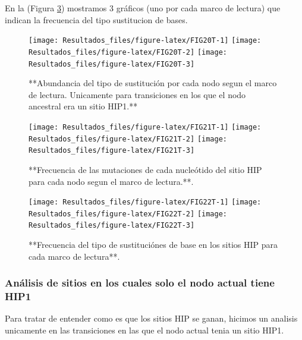 \documentclass[
]{book}
\begin{document}
En la (Figura \ref{fig:FIG22T}) mostramos 3 gráficos (uno por cada marco de lectura) que indican la frecuencia del tipo sustitucion de bases.

\begin{figure}

{\centering \texttt{[image: Resultados\_files/figure-latex/FIG20T-1]} \texttt{[image: Resultados\_files/figure-latex/FIG20T-2]} \texttt{[image: Resultados\_files/figure-latex/FIG20T-3]} 

}

\caption{**Abundancia del tipo de sustitución por cada nodo segun el marco de lectura. Unicamente para transiciones en los que el nodo ancestral era un sitio HIP1.**}\label{fig:FIG20T}
\end{figure}

\begin{figure}

{\centering \texttt{[image: Resultados\_files/figure-latex/FIG21T-1]} \texttt{[image: Resultados\_files/figure-latex/FIG21T-2]} \texttt{[image: Resultados\_files/figure-latex/FIG21T-3]} 

}

\caption{**Frecuencia de las mutaciones de cada nucleótido del sitio HIP para cada nodo segun el marco de lectura.**.}\label{fig:FIG21T}
\end{figure}

\begin{figure}

{\centering \texttt{[image: Resultados\_files/figure-latex/FIG22T-1]} \texttt{[image: Resultados\_files/figure-latex/FIG22T-2]} \texttt{[image: Resultados\_files/figure-latex/FIG22T-3]} 

}

\caption{**Frecuencia del tipo de sustituciónes de base en los sitios HIP para cada marco de lectura**.}\label{fig:FIG22T}
\end{figure}

\hypertarget{anuxe1lisis-de-sitios-en-los-cuales-solo-el-nodo-actual-tiene-hip1-4}{%
\subsubsection{Análisis de sitios en los cuales solo el nodo actual tiene HIP1}\label{anuxe1lisis-de-sitios-en-los-cuales-solo-el-nodo-actual-tiene-hip1-4}}

Para tratar de entender como es que los sitios HIP se ganan, hicimos un analisis unicamente en las transiciones en las que el nodo actual tenia un sitio HIP1.
\end{document}
